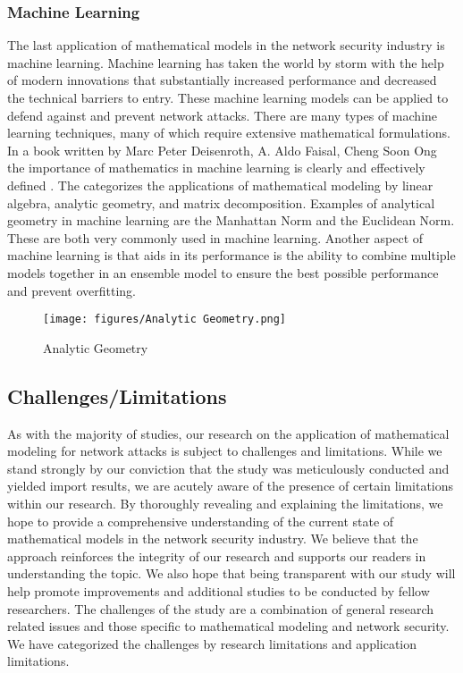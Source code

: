 \documentclass{article}
\begin{document}
\subsubsection{Machine Learning}
The last application of mathematical models in the network security industry is machine learning. Machine learning has taken the world by storm with the help of modern innovations that substantially increased performance and decreased the technical barriers to entry. These machine learning models can be applied to defend against and prevent network attacks. There are many types of machine learning techniques, many of which require extensive mathematical formulations. In a book written by Marc Peter Deisenroth, A. Aldo Faisal, Cheng Soon Ong the importance of mathematics in machine learning is clearly and effectively defined \cite{deisenroth2020mathematics}. The categorizes the applications of mathematical modeling by linear algebra, analytic geometry, and matrix decomposition. Examples of analytical geometry in machine learning are the Manhattan Norm and the Euclidean Norm. These are both very commonly used in machine learning. Another aspect of machine learning is that aids in its performance is the ability to combine multiple models together in an ensemble model to ensure the best possible performance and prevent overfitting. 

\begin{figure}
    \centering
    \texttt{[image: figures/Analytic Geometry.png]}
    \caption{Analytic Geometry}
\end{figure}

\subsection{Challenges/Limitations}
As with the majority of studies, our research on the application of mathematical modeling for network attacks is subject to challenges and limitations. While we stand strongly by our conviction that the study was meticulously conducted and yielded import results, we are acutely aware of the presence of certain limitations within our research. By thoroughly revealing and explaining the limitations, we hope to provide a comprehensive understanding of the current state of mathematical models in the network security industry. We believe that the approach reinforces the integrity of our research and supports our readers in understanding the topic. We also hope that being transparent with our study will help promote improvements and additional studies to be conducted by fellow researchers. The challenges of the study are a combination of general research related issues and those specific to mathematical modeling and network security. We have categorized the challenges by research limitations and application limitations. 
\end{document}
